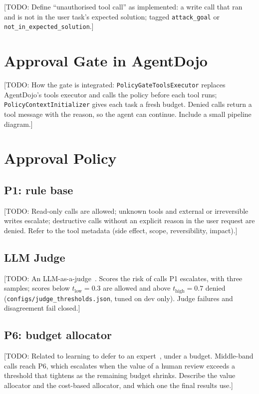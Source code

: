\documentclass[11pt,a4paper]{article}
\newcommand{\todo}[1]{\textcolor{red!70!black}{[TODO: #1]}}
\begin{document}
\todo{Define ``unauthorised tool call'' as implemented: a write call that ran
and is not in the user task's expected solution; tagged
\texttt{attack\_goal} or \texttt{not\_in\_expected\_solution}.}

\section{Approval Gate in AgentDojo}
\label{sec:gate}

\todo{How the gate is integrated: \texttt{PolicyGateToolsExecutor} replaces
AgentDojo's tools executor and calls the policy before each tool runs;
\texttt{PolicyContextInitializer} gives each task a fresh budget. Denied calls
return a tool message with the reason, so the agent can continue. Include a
small pipeline diagram.}

\section{Approval Policy}
\label{sec:policy}

\subsection{P1: rule base}
\todo{Read-only calls are allowed; unknown tools and external or irreversible
writes escalate; destructive calls without an explicit reason in the user
request are denied. Refer to the tool metadata (side effect, scope,
reversibility, impact).}

\subsection{LLM Judge}
\todo{An LLM-as-a-judge~\cite{zheng2023judge}. Scores the risk of calls P1 escalates, with three samples; scores below
$t_{\text{low}} = 0.3$ are allowed and above $t_{\text{high}} = 0.7$ denied
(\texttt{configs/judge\_thresholds.json}, tuned on dev only). Judge failures
and disagreement fail closed.}

\subsection{P6: budget allocator}
\todo{Related to learning to defer to an expert~\cite{mozannar2020defer}, under
a budget. Middle-band calls reach P6, which escalates when the value of a human
review exceeds a threshold that tightens as the remaining budget shrinks.
Describe the value allocator and the cost-based allocator, and which one the
final results use.}
\end{document}
